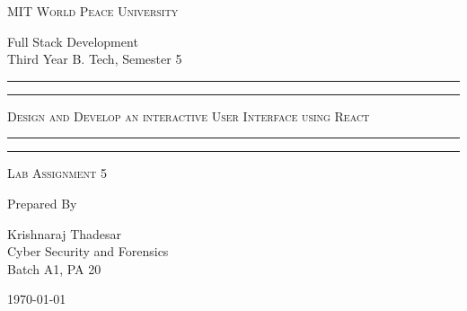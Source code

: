 \documentclass[11pt]{article}
\begin{document}
\begin{titlepage}
    \centering


    \huge\textsc{
        MIT World Peace University
    }\\

    \vspace{0.75\baselineskip} %

    \LARGE{
        Full Stack Development\\
        Third Year B. Tech, Semester 5
    }

    \vfill %


    \rule{\textwidth}{1.6pt}\vspace*{-\baselineskip}\vspace*{2pt}
    \rule{\textwidth}{0.6pt}
    \vspace{0.75\baselineskip} %



    \huge{\textsc{
            Design and Develop an interactive User Interface using React
        }} \\



    \vspace{0.5\baselineskip} %
    \rule{\textwidth}{0.6pt}\vspace*{-\baselineskip}\vspace*{2.8pt}
    \rule{\textwidth}{1.6pt}

    \vspace{1\baselineskip} %


    \LARGE\textsc{
        Lab Assignment 5
    } %
    \vfill


    Prepared By
    \vspace{0.5\baselineskip} %

    \Large{
        Krishnaraj Thadesar \\
        Cyber Security and Forensics\\
        Batch A1, PA 20
    }


    \vspace{0.5\baselineskip} %
    \today

\end{titlepage}
\end{document}
